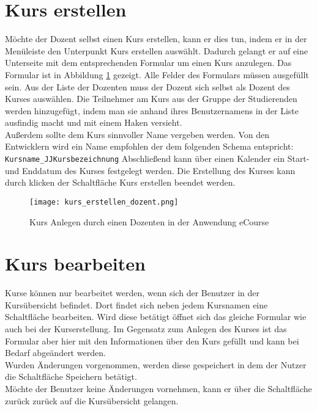 \section{Kurs erstellen}
Möchte der Dozent selbst einen Kurs erstellen, kann er dies tun, indem er in der Menüleiste den Unterpunkt \glqq Kurs erstellen\grqq\; auswählt. Dadurch gelangt er auf eine Unterseite mit dem entsprechenden Formular um einen Kurs anzulegen. Das Formular ist in Abbildung \ref{fib:kurs_anlegen} gezeigt. Alle Felder des Formulars müssen ausgefüllt sein. Aus der Liste der Dozenten muss der Dozent sich selbst als Dozent des Kurses auswählen.
Die Teilnehmer am Kurs aus der Gruppe der Studierenden werden hinzugefügt, indem man sie anhand ihres Benutzernamens in der Liste ausfindig macht und mit einem Haken versieht. \\
Außerdem sollte dem Kurs sinnvoller Name vergeben werden. Von den Entwicklern wird ein Name empfohlen der dem folgenden Schema entspricht: \\
\verb/Kursname_JJKursbezeichnung/
Abschließend kann über einen Kalender ein Start- und Enddatum des Kurses festgelegt werden. 
Die Erstellung des Kurses kann durch klicken der Schaltfläche \glqq Kurs erstellen\grqq\: beendet werden.

\begin{figure}[h]
\centering
\texttt{[image: kurs\_erstellen\_dozent.png]}
\caption{Kurs Anlegen durch einen Dozenten in der Anwendung eCourse}
\label{fib:kurs_anlegen}
\end{figure}
\section{Kurs bearbeiten}
Kurse können nur bearbeitet werden, wenn sich der Benutzer in der Kursübersicht befindet. Dort findet sich neben jedem Kursnamen eine Schaltfläche \glqq bearbeiten\grqq . Wird diese betätigt öffnet sich das gleiche Formular wie auch bei der Kurserstellung. Im Gegensatz zum Anlegen des Kurses ist das Formular aber hier mit den Informationen über den Kurs gefüllt und kann bei Bedarf abgeändert werden.\\
Wurden Änderungen vorgenommen, werden diese gespeichert in dem der Nutzer die Schaltfläche \glqq Speichern\grqq\: betätigt.\\
Möchte der Benutzer keine Änderungen vornehmen, kann er über die Schaltfläche \glqq zurück\grqq\: zurück auf die Kursübersicht gelangen.


